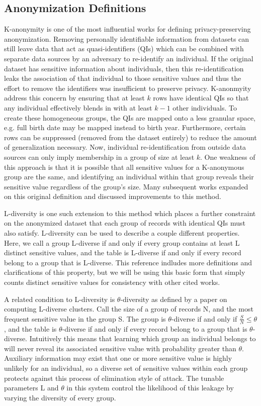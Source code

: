 \subsection{Anonymization Definitions}
K-anonymity\cite{sweeneykAnonymity} is one of the most influential works for defining privacy-preserving anonymization. Removing personally identifiable information from datasets can still leave data that act as quasi-identifiers (QIs) which can be combined with separate data sources by an adversary to re-identify an individual. If the original dataset has sensitive information about individuals, then this re-identification leaks the association of that individual to those sensitive values and thus the effort to remove the identifiers was insufficient to preserve privacy. K-anonmyity address this concern by ensuring that at least $k$ rows have identical QIs so that any individual effectively blends in with at least $k-1$ other individuals. To create these homogeneous groups, the QIs are mapped onto a less granular space, e.g. full birth date may be mapped instead to birth year. Furthermore, certain rows can be suppressed (removed from the dataset entirely) to reduce the amount of generalization necessary. Now, individual re-identification from outside data sources can only imply membership in a group of size at least $k$. One weakness of this approach is that it is possible that all sensitive values for a K-anonymous group are the same, and identifying an individual within that group reveals their sensitive value regardless of the group's size. Many subsequent works expanded on this original definition and discussed improvements to this method.

L-diversity\cite{machanavajjhalalDiversity} is one such extension to this method which places a further constraint on the anonymized dataset that each group of records with identical QIs must also satisfy. L-diversity can be used to describe a couple different properties. Here, we call a group L-diverse if and only if every group contains at least L distinct sensitive values, and the table is L-diverse if and only if every record belong to a group that is L-diverse. This reference indludes more definitions and clarifications of this property, but we will be using this basic form that simply counts distinct sensitive values for consistency with other cited works.

A related condition to L-diversity is $\theta$-diversity as defined by a paper\cite{yangEnhanced} on computing L-diverse clusters. Call the size of a group of records N, and the most frequent sensitive value in the group S. The group is $\theta$-diverse if and only if $\frac{S}{N}\leq\theta$, and the table is $\theta$-diverse if and only if every record belong to a group that is $\theta$-diverse. Intuitively this means that learning which group an individual belongs to will never reveal its associated sensitive value with probability greater than $\theta$. Auxiliary information may exist that one or more sensitive value is highly unlikely for an individual, so a diverse set of sensitive values within each group protects against this process of elimination style of attack. The tunable parameters L and $\theta$ in this system control the likelihood of this leakage by varying the diversity of every group.

